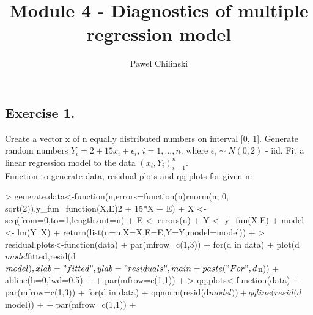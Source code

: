 \documentclass[a4paper]{article}
\title{Module 4 - Diagnostics of multiple regression model}
\author{Pawel Chilinski}
\begin{document}

\maketitle
\subsection{Exercise 1.} Create a vector x of n equally distributed numbers on
interval [0, 1]. Generate random numbers $Y_i=2+15x_i+\epsilon_i$, $i=1,...,n$.
where $\epsilon_i\sim N(0,2)$ - iid. Fit a linear regression model to the data $(x_i,Y_i)_{i=1}^n$.
\\

Function to generate data, residual plots and qq-plots for given n:
\begin{Schunk}
\begin{Sinput}
> generate.data<-function(n,errors=function(n){rnorm(n, 0, sqrt(2))},y_fun=function(X,E){2 + 15*X + E}){
+ 	X <- seq(from=0,to=1,length.out=n)
+ 	E <- errors(n)
+ 	Y <- y_fun(X,E)
+ 	model <- lm(Y~X)
+ 	return(list(n=n,X=X,E=E,Y=Y,model=model))
+ }
> residual.plots<-function(data){
+ 	par(mfrow=c(1,3))
+ 	for(d in data){
+ 		plot(d$model$fitted,resid(d$model),xlab="fitted",ylab="residuals",main=paste("For",d$n))
+ 		abline(h=0,lwd=0.5)
+ 	}
+ 	par(mfrow=c(1,1))
+ }
> qq.plots<-function(data){
+ 	par(mfrow=c(1,3))
+ 	for(d in data){
+ 		qqnorm(resid(d$model))
+ 		qqline(resid(d$model))
+ 	}
+ 	par(mfrow=c(1,1))
+ }
\end{Sinput}
\end{Schunk}
\end{document}
